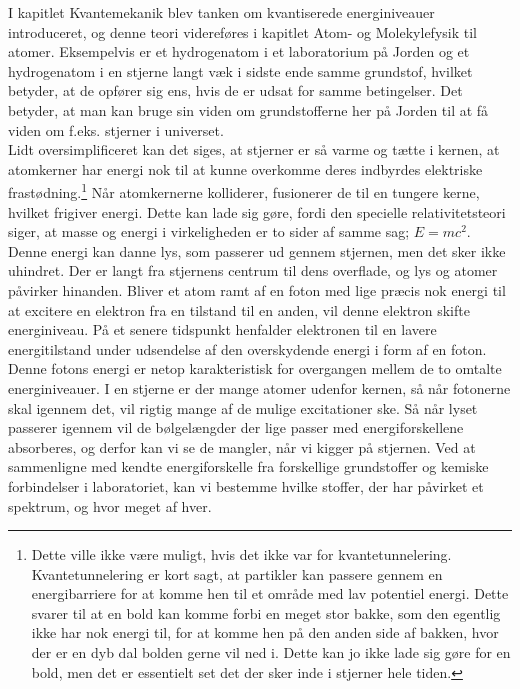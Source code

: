 I kapitlet Kvantemekanik blev tanken om kvantiserede energiniveauer introduceret, og denne teori videreføres i kapitlet Atom- og Molekylefysik til atomer. Eksempelvis er et hydrogenatom i et laboratorium på Jorden og et hydrogenatom i en stjerne langt væk i sidste ende samme grundstof, hvilket betyder, at de opfører sig ens, hvis de er udsat for samme betingelser. Det betyder, at man kan bruge sin viden om grundstofferne her på Jorden til at få viden om f.eks. stjerner i universet. \\
Lidt oversimplificeret kan det siges, at stjerner er så varme og tætte i kernen, at atomkerner har energi nok til at kunne overkomme deres indbyrdes elektriske frastødning.\footnote{Dette ville ikke være muligt, hvis det ikke var for kvantetunnelering. Kvantetunnelering er kort sagt, at partikler kan passere gennem en energibarriere for at komme hen til et område med lav potentiel energi. Dette svarer til at en bold kan komme forbi en meget stor bakke, som den egentlig ikke har nok energi til, for at komme hen på den anden side af bakken, hvor der er en dyb dal bolden gerne vil ned i. Dette kan jo ikke lade sig gøre for en bold, men det er essentielt set det der sker inde i stjerner hele tiden.} Når atomkernerne kolliderer, fusionerer de til en tungere kerne, hvilket frigiver energi. Dette kan lade sig gøre, fordi den specielle relativitetsteori siger, at masse og energi i virkeligheden er to sider af samme sag; $E=mc^2$. Denne energi kan danne lys, som passerer ud gennem stjernen, men det sker ikke uhindret. Der er langt fra stjernens centrum til dens overflade, og lys og atomer påvirker hinanden. Bliver et atom ramt af en foton med lige præcis nok energi til at excitere en elektron fra en tilstand til en anden, vil denne elektron skifte energiniveau. På et senere tidspunkt henfalder elektronen til en lavere energitilstand under udsendelse af den overskydende energi i form af en foton. Denne fotons energi er netop karakteristisk for overgangen mellem de to omtalte energiniveauer. I en stjerne er der mange atomer udenfor kernen, så når fotonerne skal igennem det, vil rigtig mange af de mulige excitationer ske. Så når lyset passerer igennem vil de bølgelængder der lige passer med energiforskellene absorberes, og derfor kan vi se de mangler, når vi kigger på stjernen. Ved at sammenligne med kendte energiforskelle fra forskellige grundstoffer og kemiske forbindelser i laboratoriet, kan vi bestemme hvilke stoffer, der har påvirket et spektrum, og hvor meget af hver.  \\

